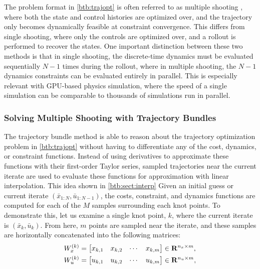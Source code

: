The problem format in \eqref{btb:trajopt} is often referred to as multiple shooting \cite{hargraves1987, betts2001}, where both the state and control histories are optimized over, and the trajectory only becomes dynamically feasible at constraint convergence. This differs from single shooting, where only the controls are optimized over, and a rollout is performed to recover the states. One important distinction between these two methods is that in single shooting, the discrete-time dynamics must be evaluated sequentially $N-1$ times during the rollout, where in multiple shooting, the $N-1$ dynamics constraints can be evaluated entirely in parallel. This is especially relevant with GPU-based physics simulation, where the speed of a single simulation can be comparable to thousands of simulations run in parallel. 

\subsubsection{Solving Multiple Shooting with Trajectory Bundles}
The trajectory bundle method is able to reason about the trajectory optimization problem in \eqref{btb:trajopt} without having to differentiate any of the cost, dynamics, or constraint functions. Instead of using derivatives to approximate these functions with their first-order Taylor series, sampled trajectories near the current iterate are used to evaluate these functions for approximation with linear interpolation. This idea shown in \ref{btb:sect:interp}
Given an initial guess or current iterate $(\bar{x}_{1:N}, \bar{u}_{1:N-1})$, the costs, constraint, and dynamics functions are computed for each of the $M$ samples surrounding each knot points. To demonstrate this, let us examine a single knot point, $k$, where the current iterate is $(\bar{x}_k, \bar{u}_k)$. From here, $m$ points are sampled near the iterate, and these samples are horizontally concatenated into the following matrices:
\begin{align}
    W_x^{(k)} &= \begin{bmatrix}
        x_{k,1} & x_{k,2} & \cdots & x_{k,m}
    \end{bmatrix} \in \mathbf{R}^{n_x \times m}, \label{btb:Wx}\\
    W_u^{(k)} &= \begin{bmatrix}
        u_{k,1} & u_{k,2} & \cdots & u_{k,m}
    \end{bmatrix} \in \mathbf{R}^{n_u \times m}, \label{btb:Wu}
\end{align}
